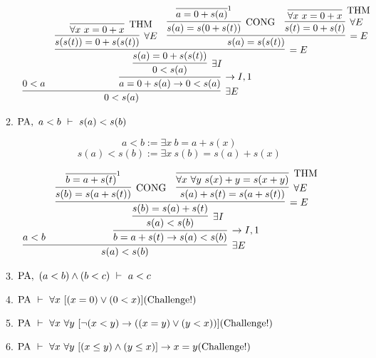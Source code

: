 \documentclass[11pt]{report}
\newcommand{\temp}[2]{{\overline{#2}}^{#1}}
\begin{document}
\begin{enumerate}
\begin{enumerate}
			\begin{center}
				$\begin{array}{c}
					\infer[\exists E]{0 < s(a)}
						{0 < a
						&
						\infer[\to I,1]{a = 0 + s(a) \to 0 < s(a)}{
							\infer[\exists I]{0 < s(a)}
								{\infer[=E]{s(a) = 0 + s(s(t))}
									{\infer[\forall E]{s(s(t)) = 0 + s(s(t))}
										{\infer[\THM]{\forall x \ x = 0 + x}{}}
									&
									\infer[=E]{s(a) = s(s(t))}
										{\infer[\text{CONG}]{s(a) = s(0 + s(t))}
											{\temp{1}{a = 0 + s(a)}}
										&
										\infer[\forall E]{s(t) = 0 + s(t)}
											{\infer[\THM]{\forall x \ x = 0 + x}{}}}}}}}
				\end{array}$			
			\end{center}
			
			
			\item $\text{PA} , \ a < b \ \vdash \ s(a) < s(b)$
			
			$$a < b := \exists x \ b = a + s(x)$$
			$$s(a) < s(b) := \exists x \ s(b) = s(a) + s(x)$$
			
			\begin{center}
				$\begin{array}{c}
					\infer[\exists E]{s(a) < s(b)}
						{a < b
						&
						\infer[\to I,1]{b = a + s(t) \to s(a) < s(b)}
						{\infer[\exists I]{s(a) < s(b)}
							{\infer[=E]{s(b) = s(a) + s(t)}
								{\infer[\text{CONG}]{s(b) = s(a + s(t))}
									{\temp{1}{b = a + s(t)}}
								&
								\infer[\forall E]{s(a) + s(t) = s(a + s(t))}
									{\infer[\THM]{\forall x \ \forall y \ s(x) + y = s(x + y)}
										{}}}}}}				
				\end{array}$
			\end{center}
			
			\newpage
			\item $\PA , \ (a < b) \land (b < c) \ \vdash \ a < c$
			
			\newpage
			\item $\PA \ \vdash \ \forall x \ [(x = 0) \lor (0 < x)] \hfill \text{(Challenge!)}$
			
			\newpage
			\item $\PA \ \vdash \ \forall x \ \forall y \ [\lnot(x<y) \to ((x=y) \lor (y<x))] \hfill \text{(Challenge!)}$
			
			\newpage
			\item $\PA \ \vdash \ \forall x \ \forall y \ [(x\leq y) \land (y\leq x)] \to x=y \hfill \text{(Challenge!)}$
		\end{enumerate}
	 
\end{enumerate}	
\end{document}
